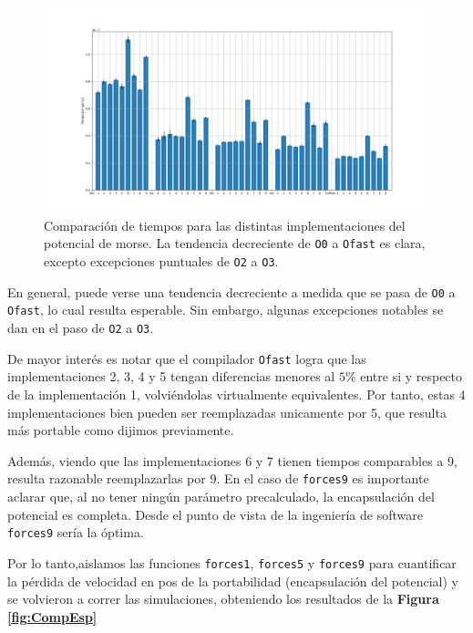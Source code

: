 \documentclass[twoside, 12pt]{article}
\begin{document}
\begin{figure}[h]
	\centering
	\includegraphics[trim = 40mm 20mm 40mm 20mm, clip, width=\columnwidth]{Comp_tiempos_morse_todos.png}
	\caption{Comparación de tiempos para las distintas implementaciones del potencial de morse. La tendencia decreciente de \texttt{O0} a \texttt{Ofast} es clara, excepto excepciones puntuales de \texttt{O2} a \texttt{O3}.}
	\label{fig:CompTodas}
\end{figure}

En general, puede verse una tendencia decreciente a medida que se pasa de \texttt{O0} a \texttt{Ofast}, lo cual resulta esperable. Sin embargo, algunas excepciones notables se dan en el paso de \texttt{O2} a \texttt{O3}.

De mayor inter\'es es notar que el compilador \texttt{Ofast} logra que las implementaciones 2, 3, 4 y 5 tengan diferencias menores al $5\%$ entre si y respecto de la implementaci\'on 1, volvi\'endolas virtualmente equivalentes.  Por tanto, estas 4 implementaciones bien pueden ser reemplazadas unicamente por 5, que resulta m\'as portable como dijimos previamente.

Adem\'as, viendo que las implementaciones 6 y 7 tienen tiempos comparables a 9, resulta razonable reemplazarlas por 9. En el caso de \texttt{forces9} es importante aclarar que, al no tener ningún parámetro precalculado, la encapsulación del potencial es completa. Desde el punto de vista de la ingeniería de software \texttt{forces9} sería la óptima. 

Por lo tanto,aislamos las funciones \texttt{forces1}, \texttt{forces5} y \texttt{forces9} para cuantificar la pérdida de velocidad en pos de la portabilidad (encapsulación del potencial) y se volvieron a correr las simulaciones, obteniendo los resultados de la \textbf{Figura \ref{fig:CompEsp}}
\end{document}
